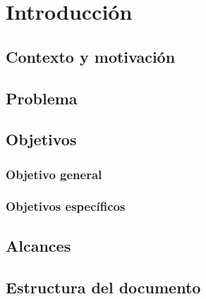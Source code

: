 \chapter{Introducción}
\label{cap:introduccion}

\section{Contexto y motivación}
\label{sec:contexto}

\section{Problema}
\label{sec:problema}

\section{Objetivos}
\label{sec:objetivos}

\subsection{Objetivo general}

\subsection{Objetivos específicos}

\section{Alcances}
\label{sec:alcances}

\section{Estructura del documento}
\label{sec:estructura}
